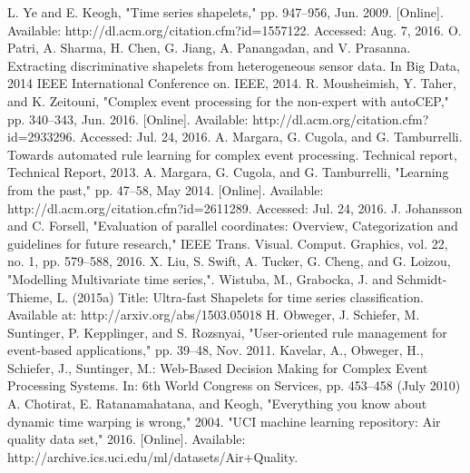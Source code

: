 \documentclass[letterpaper, 10 pt, conference]{IEEEtran}  %
\begin{document}
\begin{thebibliography}{99}

 L. Ye and E. Keogh, "Time series shapelets," pp. 947–956, Jun. 2009. [Online]. Available: http://dl.acm.org/citation.cfm?id=1557122. Accessed: Aug. 7, 2016.
 O. Patri, A. Sharma, H. Chen, G. Jiang, A. Panangadan, and V. Prasanna. Extracting discriminative shapelets from heterogeneous sensor data. In Big Data, 2014 IEEE International Conference on. IEEE, 2014.
 R. Mousheimish, Y. Taher, and K. Zeitouni, "Complex event processing for the non-expert with autoCEP," pp. 340–343, Jun. 2016. [Online]. Available: http://dl.acm.org/citation.cfm?id=2933296. Accessed: Jul. 24, 2016.
 A. Margara, G. Cugola, and G. Tamburrelli. Towards automated rule learning for complex event processing. Technical report, Technical Report, 2013.
 A. Margara, G. Cugola, and G. Tamburrelli, "Learning from the past," pp. 47–58, May 2014. [Online]. Available: http://dl.acm.org/citation.cfm?id=2611289. Accessed: Jul. 24, 2016.
 J. Johansson and C. Forsell, "Evaluation of parallel coordinates: Overview, Categorization and guidelines for future research," IEEE Trans. Visual. Comput. Graphics, vol. 22, no. 1, pp. 579–588, 2016.
 X. Liu, S. Swift, A. Tucker, G. Cheng, and G. Loizou, "Modelling Multivariate time series,". 
 Wistuba, M., Grabocka, J. and Schmidt-Thieme, L. (2015a) Title: Ultra-fast Shapelets for time series classification. Available at: http://arxiv.org/abs/1503.05018
 H. Obweger, J. Schiefer, M. Suntinger, P. Kepplinger, and S. Rozsnyai, "User-oriented rule management for event-based applications," pp. 39–48, Nov. 2011. 
 Kavelar, A., Obweger, H., Schiefer, J., Suntinger, M.: Web-Based Decision Making for Complex Event Processing Systems. In: 6th World Congress on Services, pp. 453–458 (July 2010)
 A. Chotirat, E. Ratanamahatana, and Keogh, "Everything you know about dynamic time warping is wrong," 2004.
 "UCI machine learning repository: Air quality data set," 2016. [Online]. Available: http://archive.ics.uci.edu/ml/datasets/Air+Quality.


\end{thebibliography}
\end{document}

